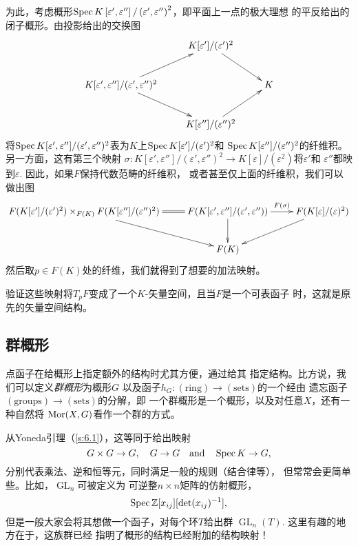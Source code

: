 为此，考虑概形$\operatorname{Spec} K\left[\varepsilon', \varepsilon''\right] /
\left(\varepsilon', \varepsilon''\right)^{2}$，即平面上一点的极大理想
的平反给出的闭子概形。由投影给出的交换图%
\[
	\xymatrix{
	& K[\varepsilon']/(\varepsilon')^2 \ar[rd] &\\
	K[\varepsilon',\varepsilon'']/(\varepsilon',\varepsilon'')^2 \ar[ru]\ar[rd]& & K\\
	& K[\varepsilon'']/(\varepsilon'')^2 \ar[ru] &
	}
\]
将$\operatorname{Spec} K[\varepsilon', \varepsilon''] /(\varepsilon', \varepsilon'')
^{2}$表为$K$上$\operatorname{Spec} K[\varepsilon'] /(\varepsilon')^{2}$和
$\operatorname{Spec} K[\varepsilon''] /(\varepsilon'')^{2}$的纤维积。
另一方面，这有第三个映射
$\sigma: K[\varepsilon', \varepsilon''] /(\varepsilon', \varepsilon''
)^{2} \to K[\varepsilon] /(\varepsilon^{2})$将$\varepsilon'$和
$\varepsilon''$都映到$\varepsilon$. 因此，如果$F$保持代数范畴的纤维积，
或者甚至仅上面的纤维积，我们可以做出图
\[
	\xymatrix{
	F(K[\varepsilon']/(\varepsilon')^2)\times_{F(K)} F(K[\varepsilon'']/(\varepsilon'')^2)\ar[rd]\ar@{=}[r]&F(K[\varepsilon',\varepsilon'']/(\varepsilon',\varepsilon'')) \ar[r]^-{F(\sigma)}\ar[d]& F(K[\varepsilon]/(\varepsilon)^2)\ar[ld]\\
	& F(K) &
	}
\]
然后取$p\in F(K)$处的纤维，我们就得到了想要的加法映射。

\begin{exe}
	验证这些映射将$T_pF$变成了一个$K$-矢量空间，且当$F$是一个可表函子
	时，这就是原先的矢量空间结构。
\end{exe}

\subsection{群概形} \label{s:6.1.4}

点函子在给概形上指定额外的结构时尤其方便，通过给其
指定结构。比方说，我们可以定义\textit{群概形}为概形$G$
以及函子$h_G:(\text{ring})\to (\text{sets})$的一个经由
遗忘函子$(\text{groups})\to (\text{sets})$的分解，即
一个群概形是一个概形，以及对任意$X$，还有一种自然将
$\operatorname{Mor}(X,G)$看作一个群的方式。

从Yoneda引理（\ref{s:6.1}），这等同于给出映射
\[
	G\times G\to G,\quad G\to G\quad \text{and}
	\quad \operatorname{Spec} K\to G,
\]
分别代表乘法、逆和恒等元，同时满足一般的规则（结合律等），
但常常会更简单些。比如，$\operatorname{GL}_n$可被定义为
可逆整$n\times n$矩阵的仿射概形，
\[
	\operatorname{Spec} \mathbb{Z}[x_{ij}][\det (x_{ij})^{-1}],
\]
但是一般大家会将其想做一个函子，对每个环$T$给出群
$\operatorname{GL}_n(T)$. 这里有趣的地方在于，这族群已经
指明了概形的结构已经附加的结构映射！
